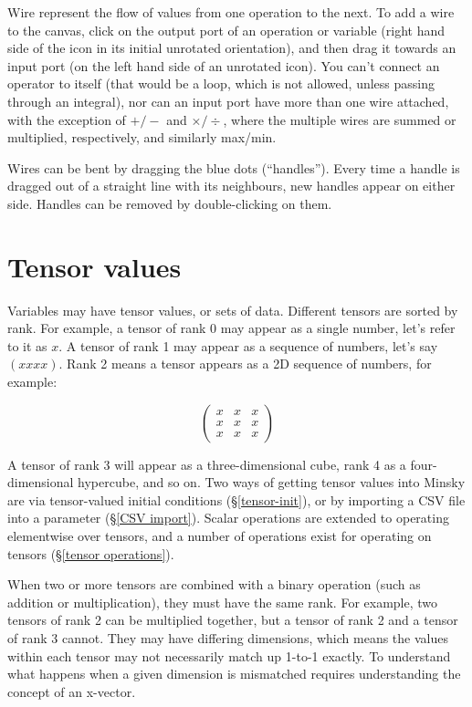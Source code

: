 Wire represent the flow of values from one operation to the next. To
add a wire to the canvas, click on the output port of an operation or
variable (right hand side of the icon in its initial unrotated
orientation), and then drag it towards an input port (on the left hand
side of an unrotated icon). You can't connect an operator to itself
(that would be a loop, which is not allowed, unless passing through an
integral), nor can an input port have more than one wire attached,
with the exception of $+/-$ and $\times/\div$, where the multiple
wires are summed or multiplied, respectively, and similarly max/min.

Wires can be bent by dragging the blue dots (``handles''). Every time
a handle is dragged out of a straight line with its neighbours, new
handles appear on either side. Handles can be removed by
double-clicking on them.

\section{Tensor values}\label{tensors}

Variables may have tensor values, or sets of data. Different tensors
are sorted by rank. For example, a tensor of rank 0 may appear as a
single number, let's refer to it as $x$. A tensor of rank 1 may appear
as a sequence of numbers, let's say $(x x x x)$. Rank 2 means a tensor
appears as a 2D sequence of numbers, for example:

\begin{displaymath}
  \left(
    \begin{array}{ccc}
      x& x& x\\
      x& x& x\\
      x& x& x
    \end{array}
  \right)
\end{displaymath}

A tensor of rank 3 will appear as a three-dimensional cube, rank 4 as
a four-dimensional hypercube, and so on. Two ways of getting tensor
values into Minsky are via tensor-valued initial conditions
(\S\ref{tensor-init}), or by importing a CSV file into a parameter
(\S\ref{CSV import}). Scalar operations are extended to operating
elementwise over tensors, and a number of operations exist for
operating on tensors (\S\ref{tensor operations}).

When two or more tensors are combined with a binary operation (such as
addition or multiplication), they must have the same rank. For
example, two tensors of rank 2 can be multiplied together, but a
tensor of rank 2 and a tensor of rank 3 cannot. They may have
differing dimensions, which means the values within each tensor may
not necessarily match up 1-to-1 exactly.  To understand what happens
when a given dimension is mismatched requires understanding the
concept of an x-vector\label{x-vector}.

